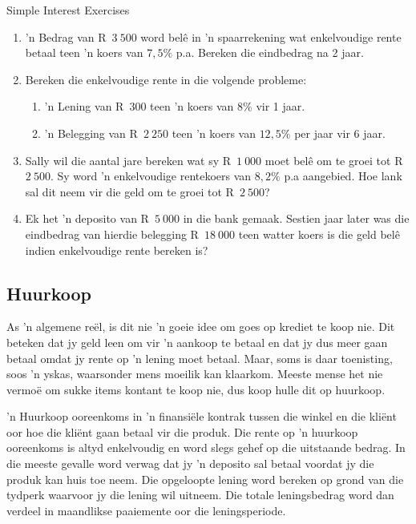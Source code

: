 \begin{exercises}{Simple Interest Exercises}
{
    \begin{enumerate}[label=\textbf{\arabic*}.]
	\item ’n Bedrag van R~$3~500$ word belê in ’n spaarrekening wat enkelvoudige rente betaal teen ’n koers van $7,5\%$ p.a. Bereken die eindbedrag na 2 jaar.

	\item Bereken die enkelvoudige rente in die volgende probleme:
	\begin{enumerate}
	    \item ’n Lening van R~$300$  teen ’n koers van $8\%$ vir 1 jaar.

	    \item ’n Belegging van R~$2~250$ teen ’n koers van $12,5\%$ per jaar vir 6 jaar.
	\end{enumerate}

	\item Sally wil die aantal jare bereken wat sy R~$1~000$ moet bel\^e om te groei tot R~$2~500$. Sy word 'n enkelvoudige rentekoers van $8,2\%$ p.a aangebied. Hoe lank sal dit neem vir die geld om te groei tot R~$2~500$?

	\item Ek het ’n deposito van R~$5~000$ in die bank gemaak. Sestien jaar later was die eindbedrag van hierdie
belegging R~$18~000$ teen watter koers is die geld belê indien enkelvoudige rente bereken is?\\
    \end{enumerate}

}
\end{exercises}


\subsection{Huurkoop}

As 'n algemene re\"el, is dit nie 'n goeie idee om goes op krediet te koop nie. Dit beteken dat jy geld leen om vir 'n aankoop te betaal en dat jy dus meer gaan betaal omdat jy rente op 'n lening moet betaal. Maar, soms is daar toenisting, soos 'n yskas, waarsonder mens moeilik kan klaarkom. Meeste mense het nie vermo\"e om sukke items kontant te koop nie, dus koop hulle dit op huurkoop.\par

'n Huurkoop ooreenkoms in 'n finansi\"ele kontrak tussen die winkel en die kli\"ent oor hoe die kli\"ent gaan betaal vir die produk. Die rente op 'n huurkoop ooreenkoms is altyd enkelvoudig en word slegs gehef op die uitstaande bedrag. In die meeste gevalle word verwag dat jy 'n deposito sal betaal voordat jy die produk kan huis toe neem. Die opgeloopte lening word bereken op grond van die tydperk waarvoor jy die lening wil uitneem. Die totale leningsbedrag word dan verdeel in maandlikse paaiemente oor die leningsperiode.


